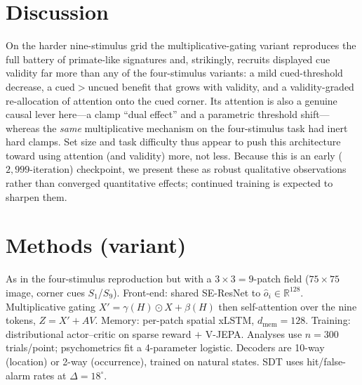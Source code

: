 \documentclass[11pt]{article}
\begin{document}
\section{Discussion}
On the harder nine-stimulus grid the multiplicative-gating variant reproduces the full battery of
primate-like signatures and, strikingly, recruits displayed cue validity far more than any of the
four-stimulus variants: a mild cued-threshold decrease, a cued$>$uncued benefit that grows with
validity, and a validity-graded re-allocation of attention onto the cued corner. Its attention is also a
genuine causal lever here---a clamp ``dual effect'' and a parametric threshold shift---whereas the
\emph{same} multiplicative mechanism on the four-stimulus task had inert hard clamps. Set size and task
difficulty thus appear to push this architecture toward using attention (and validity) more, not less.
Because this is an early ($2{,}999$-iteration) checkpoint, we present these as robust qualitative
observations rather than converged quantitative effects; continued training is expected to sharpen them.

\section{Methods (variant)}
As in the four-stimulus reproduction but with a $3\times3=9$-patch field ($75\times75$ image, corner
cues $S_1$/$S_9$). Front-end: shared SE-ResNet to $\hat o_i\in\mathbb R^{128}$. Multiplicative gating
$X'{=}\gamma(H)\odot X+\beta(H)$ then self-attention over the nine tokens, $Z=X'+AV$. Memory: per-patch
spatial xLSTM, $d_{\mathrm{mem}}{=}128$. Training:
distributional actor--critic on sparse reward $+$ V-JEPA. Analyses use $n{=}300$ trials/point;
psychometrics fit a 4-parameter logistic. Decoders are 10-way (location) or 2-way (occurrence), trained
on natural states. SDT uses hit/false-alarm rates at $\Delta{=}18^\circ$.
\end{document}
